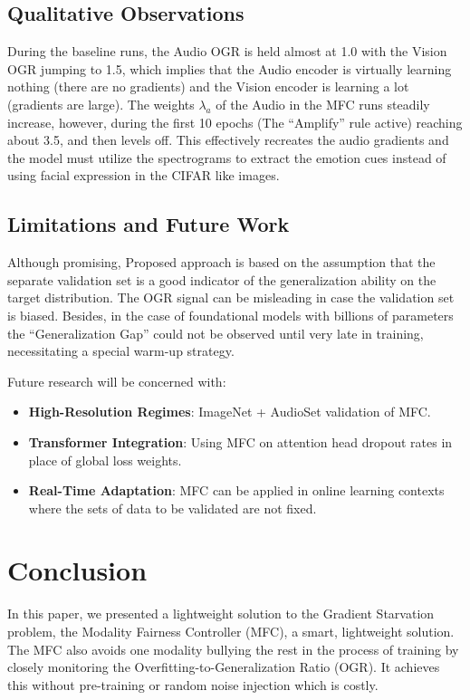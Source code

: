 \documentclass[preprint,a4paper, 10pt, 5p]{elsarticle}
\begin{document}
\subsection{Qualitative Observations}
During the baseline runs, the Audio OGR is held almost at 1.0 with the Vision OGR jumping to 1.5, which implies that the Audio encoder is virtually learning nothing (there are no gradients) and the Vision encoder is learning a lot (gradients are large). The weights $\lambda_a$ of the Audio in the MFC runs steadily increase, however, during the first 10 epochs (The ``Amplify'' rule active) reaching about 3.5, and then levels off. This effectively recreates the audio gradients and the model must utilize the spectrograms to extract the emotion cues instead of using facial expression in the CIFAR like images.

\subsection{Limitations and Future Work}
Although promising, Proposed approach is based on the assumption that the separate validation set is a good indicator of the generalization ability on the target distribution. The OGR signal can be misleading in case the validation set is biased. Besides, in the case of foundational models with billions of parameters the ``Generalization Gap'' could not be observed until very late in training, necessitating a special warm-up strategy.

Future research will be concerned with:
\begin{itemize}
    \item \textbf{High-Resolution Regimes}: ImageNet + AudioSet \cite{gemmeke2017audio} validation of MFC.
    \item \textbf{Transformer Integration}: Using MFC on attention head dropout rates in place of global loss weights.
    \item \textbf{Real-Time Adaptation}: MFC can be applied in online learning contexts where the sets of data to be validated are not fixed.
\end{itemize}

\section{Conclusion}
In this paper, we presented a lightweight solution to the Gradient Starvation problem, the Modality Fairness Controller (MFC), a smart, lightweight solution. The MFC also avoids one modality bullying the rest in the process of training by closely monitoring the Overfitting-to-Generalization Ratio (OGR). It achieves this without pre-training or random noise injection which is costly.
\end{document}
